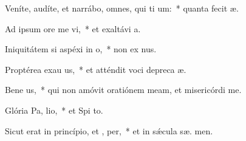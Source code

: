 \item Veníte, audíte, et narrábo, omnes, qui ti um:~* quanta fecit  æ.
\item Ad ipsum ore me vi,~* et exaltávi   a.
\item Iniquitátem si aspéxi in  o,~* non ex nus.
\item Proptérea exau us,~* et atténdit voci depreca æ.
\item Bene us,~* qui non amóvit oratiónem meam, et misericórdi   me.
\item Glória Pa,  lio,~* et Spi to.
\item Sicut erat in princípio, et ,  per,~* et in sǽcula sæ. men.
